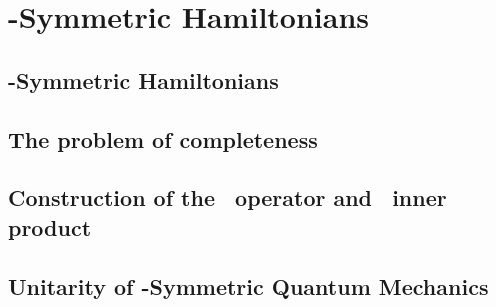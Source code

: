\chapter{\PT-Symmetric Hamiltonians}\label{ch:pt-symmetric-hamiltonians}
    \section{\PT-Symmetric Hamiltonians}
    \section{The problem of completeness}
    \section{Construction of the \hC\ operator and \CPT\ inner product}
    \section{Unitarity of \PT-Symmetric Quantum Mechanics}
